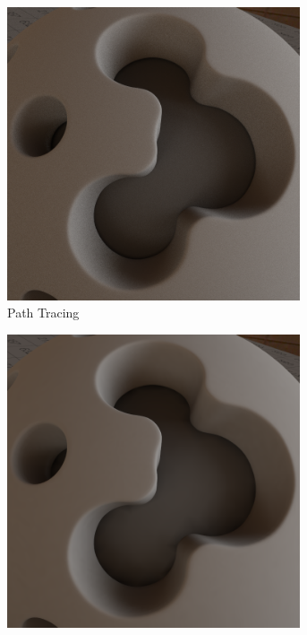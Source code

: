 		\begin{figure}[h]
			\begin{subfigure}[t]{0.33\textwidth}
				\center
				\includegraphics[width=0.95\textwidth]{pic/irrmap-shaderball_e3-ref.png}
				\caption{Path Tracing}
				\label{subfig:irrmap-shaderball-e3-ref}
			\end{subfigure}
			\begin{subfigure}[t]{0.33\textwidth}
				\center
				\includegraphics[width=0.95\textwidth]{pic/irrmap-shaderball_e3-vmap.png}

\end{subfigure}
\end{figure}
